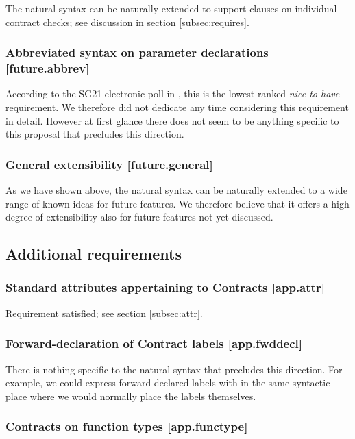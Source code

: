 The natural syntax can be naturally extended to support  clauses on individual contract checks; see discussion in section \ref{subsec:requires}.

\subsubsection{Abbreviated syntax on parameter declarations  [future.abbrev]}

According to the SG21 electronic poll in \cite{P2885R3}, this is the lowest-ranked \emph{nice-to-have} requirement. We therefore did not dedicate any time considering this requirement in detail. However at first glance there does not seem to be anything specific to this proposal that precludes this direction.

\subsubsection{General extensibility  [future.general]}

As we have shown above, the natural syntax can be naturally extended to a wide range of known ideas for future features. We therefore believe that it offers a high degree of extensibility also for future features not yet discussed.

\label{subsec:future}

\subsection{Additional requirements}

\subsubsection{Standard attributes appertaining to Contracts  [app.attr]}

Requirement satisfied; see section \ref{subsec:attr}.

\subsubsection{ Forward-declaration of Contract labels  [app.fwddecl]}

There is nothing specific to the natural syntax that precludes this direction. For example, we could express forward-declared labels with  in the same syntactic place where we would normally place the labels themselves.

\subsubsection{Contracts on function types  [app.functype]}

